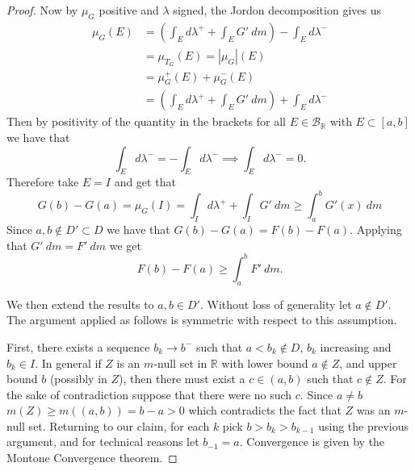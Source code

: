 \documentclass[11pt]{amsart}
\theoremstyle{definition}
\numberwithin{theorem}{section}
\numberwithin{definition}{section}
\numberwithin{equation}{section}
\def\scriptb{{\mathcal B}}
\begin{document}
\begin{proof}
 	 Now by $\mu_G$ positive and $\lambda$ signed, the Jordon decomposition gives us \begin{equation*}
 	 	\begin{aligned}
 		 	\mu_G(E) &= \left( \int_E d\lambda^+ + \int_E G'\ dm\right) - \int_E d\lambda^- \\
 		 	&=  \mu_{T_G}(E) = |\mu_G|(E) \\
 		 	&= \mu_G^+(E) + \mu_G^-(E) \\
 		 	&= \left( \int_E d\lambda^+ + \int_E G'\ dm\right) + \int_E d\lambda^-
 	 	\end{aligned}
 	 \end{equation*} Then by positivity of the quantity in the brackets for all $E \in \scriptb_\mathbb{R}$ with $E \subset [a,b]$ we have that
 	 \begin{equation*}
 	  	\int_E d\lambda^- = - \int_E d\lambda^- \implies \int_E d\lambda^- = 0.
 	  \end{equation*} 
 	  Therefore take $E = I$ and get that
 	  \begin{equation*}
 	  	G(b) - G(a) = \mu_G(I)  =  \int_I d\lambda^+ + \int_I G'\ dm \geq \int_a^b G'(x)\ dm
 	  \end{equation*} 
 	  Since $a,b \notin D' \subset D$ we have that $G(b) - G(a) = F(b) - F(a)$. Applying that $G'\ dm = F'\ dm$ we get
 	  \begin{equation*}
 	  	F(b) - F(a) \geq \int_a^b F'\ dm.
 	  \end{equation*}

 	  We then extend the results to $a,b \in D'$. Without loss of generality let $a \not\in D'$. The argument applied as follows is symmetric with respect to this assumption. 

 	  First, there exists a sequence $b_k \to b^-$ such that $a< b_k \notin D$, $b_k$ increasing and $b_k \in I$. In general if $Z$
 	  is an $m$-null set in $\mathbb{R}$ with lower bound $a \notin Z$, and upper bound $b$ (possibly in $Z$), then there must exist a $c \in (a,b)$ such that $c \not\in Z$. For the sake of contradiction suppose that there were no such $c$. Since $a \neq b$ $m(Z) \geq m((a,b)) = b -a > 0$ which contradicts the fact that $Z$ was an $m$-null set. Returning to our claim, for each $k$ pick $b > b_k > b_{k-1}$ using the previous argument, and for technical reasons let $b_{-1} = a$. Convergence is given by the Montone Convergence theorem.


\end{proof}
\end{document}
